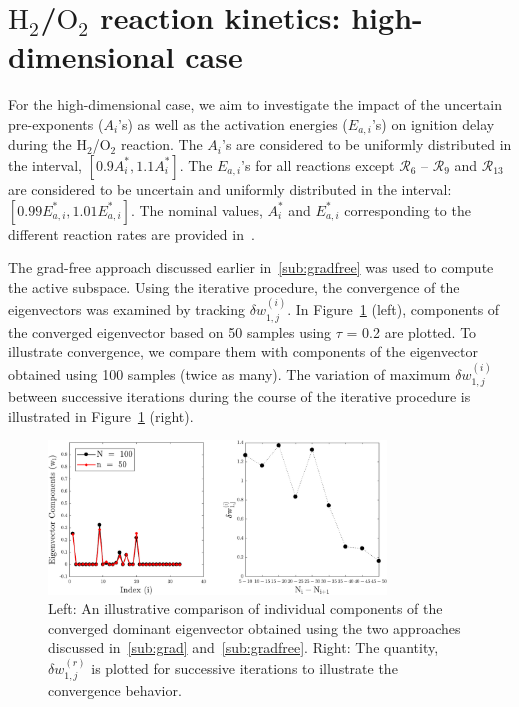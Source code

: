 \section{$\text{H}_2$/$\text{O}_2$ reaction kinetics: high-dimensional case}
\label{sec:app}

For the high-dimensional case, we aim to investigate the impact of the uncertain
pre-exponents ($A_i$'s) as well as the activation energies ($E_{a,i}$'s) on ignition 
delay during the H$_2$/O$_2$ reaction. The $A_i$'s are considered to be uniformly
distributed in the interval, $[0.9A_i^\ast, 1.1A_i^\ast]$. The $E_{a,i}$'s for all
reactions except $\mathcal{R}_6$ -- $\mathcal{R}_9$ and $\mathcal{R}_{13}$
are considered to be uncertain and uniformly distributed in the interval: 
$[0.99E_{a,i}^\ast, 1.01E_{a,i}^\ast]$. The nominal values, $A_i^\ast$ and $E_{a,i}^\ast$
corresponding to the different reaction rates are provided in~\cite{Yetter:1991}. 

The grad-free approach discussed earlier in~\ref{sub:gradfree} was used to compute the
active subspace. Using the iterative procedure, the convergence of the eigenvectors
was examined by tracking $\delta w_{1,j}^{(i)}$. In Figure~\ref{fig:conv_app} (left),
components of the converged eigenvector based on 50 samples using $\tau$ = 0.2 are plotted.
To illustrate convergence, we compare them with components of the eigenvector obtained
using 100 samples (twice as many). The variation of maximum $\delta w_{1,j}^{(i)}$ between
successive iterations during the course of the iterative procedure is illustrated in 
Figure~\ref{fig:conv_app} (right). 
%
\begin{figure}[htbp]
 \begin{center}
  \includegraphics[width=0.8\textwidth]{./Figures/eigv10}
\caption{Left: An illustrative comparison of individual components of the converged dominant eigenvector obtained
using the two approaches discussed in~\ref{sub:grad} and~\ref{sub:gradfree}. Right: The quantity,  $\delta w_{1,j}^{(r)}$
is plotted for successive iterations to illustrate the convergence behavior.}
\label{fig:conv_app}
\end{center}
\end{figure}
%
  

